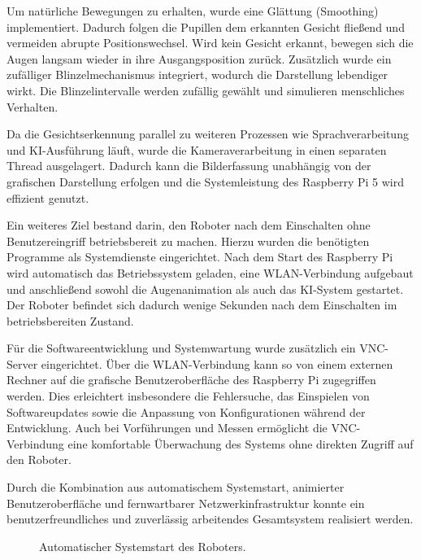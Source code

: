 Um natürliche Bewegungen zu erhalten, wurde eine Glättung (Smoothing) implementiert. Dadurch folgen die Pupillen dem erkannten Gesicht fließend und vermeiden abrupte Positionswechsel. Wird kein Gesicht erkannt, bewegen sich die Augen langsam wieder in ihre Ausgangsposition zurück. Zusätzlich wurde ein zufälliger Blinzelmechanismus integriert, wodurch die Darstellung lebendiger wirkt. Die Blinzelintervalle werden zufällig gewählt und simulieren menschliches Verhalten.

Da die Gesichtserkennung parallel zu weiteren Prozessen wie Sprachverarbeitung und KI-Ausführung läuft, wurde die Kameraverarbeitung in einen separaten Thread ausgelagert. Dadurch kann die Bilderfassung unabhängig von der grafischen Darstellung erfolgen und die Systemleistung des Raspberry Pi 5 wird effizient genutzt.

Ein weiteres Ziel bestand darin, den Roboter nach dem Einschalten ohne Benutzereingriff betriebsbereit zu machen. Hierzu wurden die benötigten Programme als Systemdienste eingerichtet. Nach dem Start des Raspberry Pi wird automatisch das Betriebssystem geladen, eine WLAN-Verbindung aufgebaut und anschließend sowohl die Augenanimation als auch das KI-System gestartet. Der Roboter befindet sich dadurch wenige Sekunden nach dem Einschalten im betriebsbereiten Zustand.

Für die Softwareentwicklung und Systemwartung wurde zusätzlich ein VNC-Server eingerichtet. Über die WLAN-Verbindung kann so von einem externen Rechner auf die grafische Benutzeroberfläche des Raspberry Pi zugegriffen werden. Dies erleichtert insbesondere die Fehlersuche, das Einspielen von Softwareupdates sowie die Anpassung von Konfigurationen während der Entwicklung. Auch bei Vorführungen und Messen ermöglicht die VNC-Verbindung eine komfortable Überwachung des Systems ohne direkten Zugriff auf den Roboter.

Durch die Kombination aus automatischem Systemstart, animierter Benutzeroberfläche und fernwartbarer Netzwerkinfrastruktur konnte ein benutzerfreundliches und zuverlässig arbeitendes Gesamtsystem realisiert werden.

\begin{figure}[H]
	\centering
	\caption{Automatischer Systemstart des Roboters.}
\end{figure}

